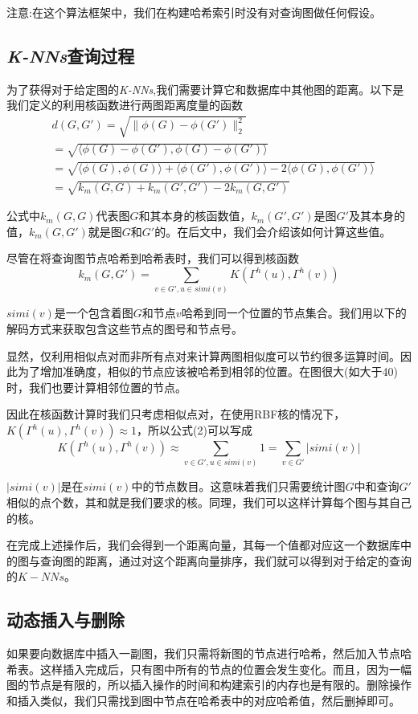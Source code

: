 \documentclass{article}
\begin{document}
注意:在这个算法框架中，我们在构建哈希索引时没有对查询图做任何假设。



\subsection{\emph{K-NNs}查询过程}
为了获得对于给定图的\emph{K-NNs},我们需要计算它和数据库中其他图的距离。以下是我们定义的利用核函数进行两图距离度量的函数
\begin{equation}
\begin{split}
    &d(G,G')=\sqrt{\|\phi(G)-\phi(G')\|_{2}^{2}}\\
              &=\sqrt{\langle\phi(G)-\phi(G'),\phi(G)-\phi(G')\rangle}\\
              &=\sqrt{\langle\phi(G),\phi(G)\rangle+\langle\phi(G'),\phi(G')\rangle-2\langle\phi(G),\phi(G')\rangle}\\
              &=\sqrt{k_{m}(G,G)+k_{m}(G',G')-2k_{m}(G,G')}
\end{split}
\end{equation}

公式中$k_{m}(G,G)$代表图$G$和其本身的核函数值，$k_{m}(G',G')$是图$G'$及其本身的值，$k_{m}(G,G')$就是图$G$和$G'$的。在后文中，我们会介绍该如何计算这些值。

尽管在将查询图节点哈希到哈希表时，我们可以得到核函数
\begin{equation}
k_{m}(G,G')=\sum_{v\in G',u\in simi(v)}K(\Gamma^{h}(u),\Gamma^{h}(v))
\end{equation}

$simi(v)$是一个包含着图$G$和节点$v$哈希到同一个位置的节点集合。我们用以下的解码方式来获取包含这些节点的图号和节点号。

显然，仅利用相似点对而非所有点对来计算两图相似度可以节约很多运算时间。因此为了增加准确度，相似的节点应该被哈希到相邻的位置。在图很大(如大于40)时，我们也要计算相邻位置的节点。

因此在核函数计算时我们只考虑相似点对，在使用RBF核的情况下，$K(\Gamma^{h}(u),\Gamma^{h}(v))\approx1$，所以公式(2)可以写成
\begin{equation}
    K(\Gamma^{h}(u),\Gamma^{h}(v))\approx\sum_{v\in G',u\in simi(v)}1=\sum_{v\in G'}|simi(v)| 
\end{equation}

$|simi(v)|$是在$simi(v)$中的节点数目。这意味着我们只需要统计图$G$中和查询$G'$相似的点个数，其和就是我们要求的核。同理，我们可以这样计算每个图与其自己的核。

在完成上述操作后，我们会得到一个距离向量，其每一个值都对应这一个数据库中的图与查询图的距离，通过对这个距离向量排序，我们就可以得到对于给定的查询的$K-NNs$。

\subsection{动态插入与删除}
如果要向数据库中插入一副图，我们只需将新图的节点进行哈希，然后加入节点哈希表。这样插入完成后，只有图中所有的节点的位置会发生变化。而且，因为一幅图的节点是有限的，所以插入操作的时间和构建索引的内存也是有限的。删除操作和插入类似，我们只需找到图中节点在哈希表中的对应哈希值，然后删掉即可。

\ifx\allfiles\undefined
\renewcommand\refname{参考文献}


\end{document}
